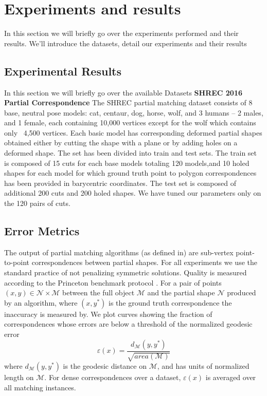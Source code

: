 \documentclass[10pt,twocolumn,letterpaper]{article}
\begin{document}
\section{Experiments and results}\label{section:results}

In this section we will briefly go over the experiments performed and their results. We'll introduce the datasets, detail our experiments and their results
\subsection{Experimental Results}
In this section we will briefly go over the available Datasets
\textbf{SHREC 2016 Partial Correspondence}  
The SHREC partial matching dataset\cite{cosmo2016shrec} consists of 8 base, neutral pose models: cat, centaur, dog, horse, wolf, and 3 humans – 2 males, and 1 female, each containing 10,000 vertices except for the wolf which contains only ~4,500 vertices. Each basic model has corresponding deformed partial shapes obtained either by cutting the shape with a plane or by adding holes on a deformed shape. The set has been divided into train and test sets. The train set is composed of 15 cuts for each base models totaling 120 models,and 10 holed shapes for each model for which ground truth point to polygon correspondences has been provided in barycentric coordinates. The test set is composed of additional 200 cuts and 200 holed shapes. We have tuned our parameters only on the 120 pairs of cuts.


\subsection{Error Metrics}
The output of partial matching algorithms (as defined in\cite{cosmo2016shrec}) are sub-vertex point-to-point correspondences between partial shapes.
For all experiments we use the standard practice of not penalizing symmetric solutions. Quality is measured according to the Princeton benchmark protocol \cite{kim2011blended}. For a pair of points $(x,y)\in \mathcal{N}\times \mathcal{M}$ between the full object $\mathcal{M}$ and the partial shape $\mathcal{N}$ produced by an algorithm, where $(x,y^*)$ is the ground truth correspondence the inaccuracy is measured by. We plot curves showing the fraction of correspondences whose errors are below a threshold of the normalized geodesic error
\begin{equation}
\varepsilon(x)=\frac{d_{\mathcal{M}}(y,y^*)}{\sqrt{area(\mathcal{M})}}
\end{equation}
where $d_{\mathcal{M}}(y,y^*)$ is the geodesic distance on $\mathcal{M}$, and has units of normalized length on $\mathcal{M}$. For dense correspondences over a dataset, $\varepsilon(x)$ is averaged over all matching instances.
\end{document}
